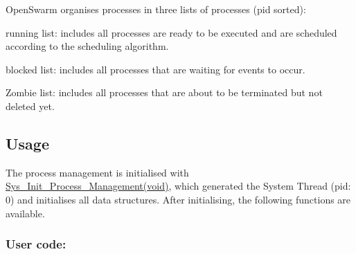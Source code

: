 Open\+Swarm organises processes in three lists of processes (pid sorted)\+:
\begin{DoxyEnumerate}
\item running list\+: includes all processes are ready to be executed and are scheduled according to the scheduling algorithm.
\item blocked list\+: includes all processes that are waiting for events to occur.
\item Zombie list\+: includes all processes that are about to be terminated but not deleted yet.
\end{DoxyEnumerate}\hypertarget{group__process_process_usage}{}\subsection{Usage}\label{group__process_process_usage}
The process management is initialised with \hyperlink{process__Management_8h_ae2b7783ff0eedf8b5cc0fbe90ffc6a6b}{Sys\+\_\+\+Init\+\_\+\+Process\+\_\+\+Management(void)}, which generated the System Thread (pid\+: 0) and initialises all data structures. After initialising, the following functions are available. \hypertarget{group__process_process_usercode}{}\subsubsection{User code\+:}\label{group__process_process_usercode}

